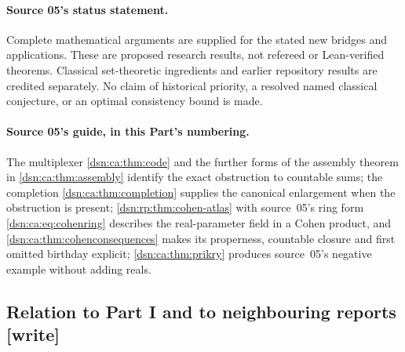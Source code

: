 \documentclass[11pt,a4paper]{article}
\numberwithin{equation}{section}
\theoremstyle{definition}
\theoremstyle{remark}
\newcommand{\writetag}{\textup{\textsf{\small[write]}}}
\begin{document}
\paragraph{Source 05's status statement.}
Complete mathematical arguments are supplied for the stated new bridges
and applications. These are proposed research results, not refereed or
Lean-verified theorems. Classical set-theoretic ingredients and earlier
repository results are credited separately. No claim of historical
priority, a resolved named classical conjecture, or an optimal consistency
bound is made.

\paragraph{Source 05's guide, in this Part's numbering.}
The multiplexer \cref{dsn:ca:thm:code} and the further forms of the
assembly theorem in \cref{dsn:ca:thm:assembly} identify the exact
obstruction to countable sums; the completion
\cref{dsn:ca:thm:completion} supplies the canonical enlargement when the
obstruction is present; \cref{dsn:rp:thm:cohen-atlas} with source~05's
ring form \eqref{dsn:ca:eq:cohenring} describes the real-parameter field
in a Cohen product, and \cref{dsn:ca:thm:cohenconsequences} makes its
properness, countable closure and first omitted birthday explicit;
\cref{dsn:ca:thm:prikry} produces source~05's negative example without
adding reals.

\subsection{Relation to Part I and to neighbouring reports \writetag}
\label{dsn:rp:sub:relation}
\end{document}
